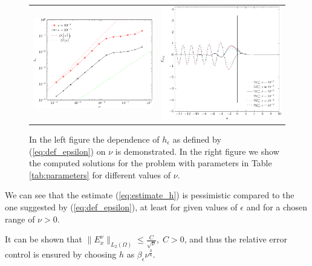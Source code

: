\begin{figure}
\begin{tabular}{cc}
\includegraphics[height=0.32\textwidth]{pics_frequency_domain/h_nu.pdf}
&
\includegraphics[height=0.32\textwidth]{pics_frequency_domain/res_sol.pdf}
\end{tabular}
\caption{In the left figure the dependence of $h_{\epsilon}$ as defined by (\ref{eq:def_epsilon}) on $\nu$ is demonstrated. 
In the right figure we show the computed solutions for the problem with parameters in Table \ref{tab:parameters} for different values of $\nu$. }
\label{fig:dependence}
\end{figure}
We can see that the estimate (\ref{eq:estimate_h}) is pessimistic compared to the one suggested by (\ref{eq:def_epsilon}), 
at least for given values of $\epsilon$ and for a chosen range of $\nu>0$.
\begin{remark}
It can be shown that $\|E^{\nu}_{x}\|_{L_{2}(\Omega)}\leq \frac{C}{\sqrt{\nu}},\; C>0$, 
and thus the relative error control
\bealn
 \leq \epsilon
\eealn
 is ensured by choosing $h$ as $\beta_{\epsilon}\nu^{\frac{3}{4}}$.
\end{remark}

